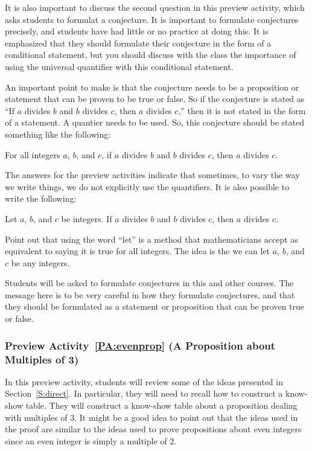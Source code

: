 It is also important to discuss the second question in this preview activity, which asks students to formulat a conjecture.  It is important to formulate conjectures precisely, and students have had little or no practice at doing this.  It is emphasized that they should formulate their conjecture in the form of a conditional statement, but you should discuss with the class the importance of using the universal quantifier with this conditional statement.

An important point to make is that the conjecture needs to be a proposition or statement that can be proven to be true or false.  So if the conjecture is stated as ``If $a$ divides $b$ and $b$ divides $c$, then $a$ divides $c$,'' then it is not stated in the form of a statement.  A quantier needs to be used. So, this conjecture should be stated something like the following:

\begin{center}
For all integers $a$, $b$, and  $c$, if $a$ divides $b$ and $b$ divides $c$, then $a$ divides $c$.
\end{center}

The answers for the preview activities indicate that sometimes, to vary the way we write things, we do not explicitly use the quantifiers.  It is also possible to write the following:

\vskip6pt
Let $a$, $b$, and  $c$  be integers.  If $a$ divides $b$ and $b$ divides $c$, then $a$ divides 
$c$.
\vskip6pt

Point out that using the word ``let'' is a method that mathematicians accept as equivalent to saying it is true for all integers.  The idea is the we can let $a$, $b$, and  $c$  be any integers.

Students will be asked to formulate conjectures in this and other courses.  The message here is to be very careful in how they formulate conjectures, and that they should be formulated as a statement or proposition that can be proven true or false.



\subsubsection*{Preview Activity~\ref{PA:evenprop} (A Proposition about Multiples of 3)}  
In this preview activity, students will review some of the ideas presented in Section~\ref{S:direct}.  In particular, they will need to recall how to construct a know-show table.  They will construct a know-show table about a proposition dealing with multiples of 3.  It might be a good idea to point out that the ideas used in the proof are similar to the ideas used to prove propositions about even integers since an even integer is simply a multiple of 2.

